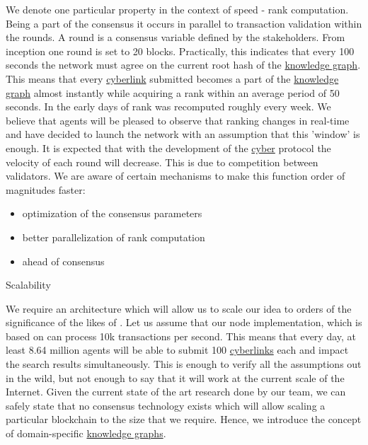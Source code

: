 \documentclass[8pt,oneside]{amsart}
\makeatletter
\newcommand{\linkred}[2]{\href{#1}{\color{red}{#2}}}
\renewcommand\subsection{\@startsection{subsection}
                                    {2}{\z@}
                                    {-3.25ex\@plus -1ex \@minus -.2ex}
                                    {0ex \@plus .2ex}
                                    {\play\Large}
                        }
\newcommand{\titleSection}[1]{\subsection{#1}}
\makeatother
\begin{document}
We denote one particular \linkred{https://github.com/cybercongress/cyberd}{cyberd} property in the context of speed - rank computation. Being a part of the consensus it occurs in parallel to transaction validation within the rounds. A round is a consensus variable defined by the stakeholders. From inception one round is set to 20 blocks. Practically, this indicates that every 100 seconds the network must agree on the current root hash of the {\hyperref[knowledge-graph]{knowledge graph}}. This means that every {\hyperref[cyberlinks]{cyberlink}} submitted becomes a part of the {\hyperref[knowledge-graph]{knowledge graph}} almost instantly while acquiring a rank within an average period of 50 seconds. In the early days of \linkred{https://google.com}{Google} rank was recomputed roughly every week. We believe that agents will be pleased to observe that ranking changes in real-time and have decided to launch the network with an assumption that this 'window' is enough. It is expected that with the development of the {\hyperref[cyber]{cyber}} protocol the velocity of each round will decrease. This is due to competition between validators. We are aware of certain mechanisms to make this function order of magnitudes faster:

\begin{itemize}
\item optimization of the consensus parameters
\item better parallelization of rank computation
\item \linkred{https://ipfs.io/ipfs/QmZKchdeBtUeZKvsFbuWY2PHg6qn6jHjUDrg5KjHzDGWHj}{better clock} ahead of consensus
\end{itemize}

\titleSection{Scalability}\label{scalability}

We require an architecture which will allow us to scale our idea to orders of the significance of the likes of \linkred{https://google.com}{Google}. Let us assume that our node implementation, which is based on \linkred{https://github.com/cosmos/cosmos-sdk}{cosmos-sdk} can process 10k transactions per second. This means that every day, at least 8.64 million agents will be able to submit 100 {\hyperref[cyberlinks]{cyberlinks}} each and impact the search results simultaneously. This is enough to verify all the assumptions out in the wild, but not enough to say that it will work at the current scale of the Internet. Given the current state of the art research done by our team, we can safely state that no consensus technology exists which will allow scaling a particular blockchain to the size that we require. Hence, we introduce the concept of domain-specific {\hyperref[knowledge-graph]{knowledge graphs}}.
\end{document}
